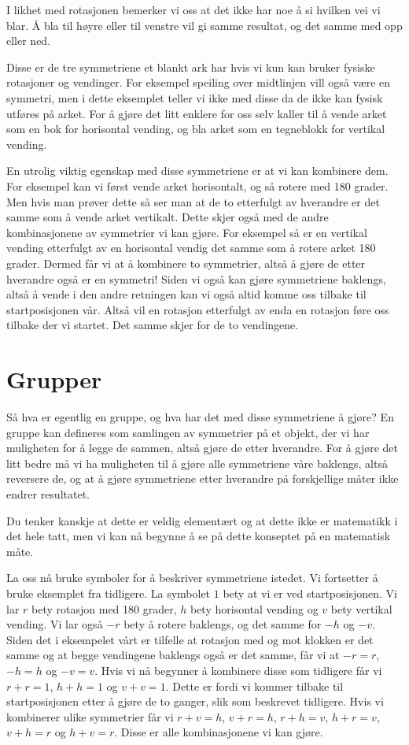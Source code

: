 I likhet med rotasjonen bemerker vi oss at det ikke har noe å si hvilken vei vi blar. 
Å bla til høyre eller til venstre vil gi samme resultat, 
og det samme med opp eller ned. 

Disse er de tre symmetriene et blankt ark har hvis vi kun kan bruker fysiske rotasjoner og vendinger. 
For eksempel speiling over midtlinjen vill også være en symmetri, 
men i dette eksemplet teller vi ikke med disse da de ikke kan fysisk utføres på arket. 
For å gjøre det litt enklere for oss selv kaller til å vende arket som en bok for horisontal vending, 
og bla arket som en tegneblokk for vertikal vending. 

En utrolig viktig egenskap med disse symmetriene er at vi kan kombinere dem. 
For eksempel kan vi først vende arket horisontalt, 
og så rotere med 180 grader. 
Men hvis man prøver dette så ser man at de to etterfulgt av hverandre er det samme som å vende arket vertikalt. 
Dette skjer også med de andre kombinasjonene av symmetrier vi kan gjøre. 
For eksempel så er en vertikal vending etterfulgt av en horisontal vendig det samme som å rotere arket 180 grader. 
Dermed får vi at å kombinere to symmetrier, 
altså å gjøre de etter hverandre også er en symmetri! 
Siden vi også kan gjøre symmetriene baklengs, 
altså å vende i den andre retningen kan vi også altid komme oss tilbake til startposisjonen vår. 
Altså vil en rotasjon etterfulgt av enda en rotasjon føre oss tilbake der vi startet. 
Det samme skjer for de to vendingene. 

\section{Grupper}

Så hva er egentlig en gruppe, 
og hva har det med disse symmetriene å gjøre? 
En gruppe kan defineres som samlingen av symmetrier på et objekt, 
der vi har muligheten for å legge de sammen, 
altså gjøre de etter hverandre. 
For å gjøre det litt bedre må vi ha muligheten til å gjøre alle symmetriene våre baklengs, 
altså reversere de, 
og at å gjøre symmetriene etter hverandre på forskjellige måter ikke endrer resultatet. 

Du tenker kanskje at dette er veldig elementært og at dette ikke er matematikk i det hele tatt, 
men vi kan nå begynne å se på dette konseptet på en matematisk måte. 

La oss nå bruke symboler for å beskriver symmetriene istedet. 
Vi fortsetter å bruke eksemplet fra tidligere. 
La symbolet $1$ bety at vi er ved startposisjonen. 
Vi lar $r$ bety rotasjon med 180 grader, 
$h$ bety horisontal vending og 
$v$ bety vertikal vending. 
Vi lar også $-r$ bety å rotere baklengs, 
og det samme for $-h$ og $-v$. 
Siden det i eksempelet vårt er tilfelle at rotasjon med og mot klokken er det samme og at begge vendingene baklengs også er det samme, 
får vi at $-r=r$, 
$-h=h$ og $-v=v$. 
Hvis vi nå begynner å kombinere disse som tidligere får vi $r+r=1$, 
$h+h=1$ og $v+v=1$. 
Dette er fordi vi kommer tilbake til startposisjonen etter å gjøre de to ganger, 
slik som beskrevet tidligere. 
Hvis vi kombinerer ulike symmetrier får vi $r+v=h$, 
$v+r=h$, 
$r+h=v$, 
$h+r=v$, 
$v+h=r$ og $h+v=r$. 
Disse er alle kombinasjonene vi kan gjøre. 

